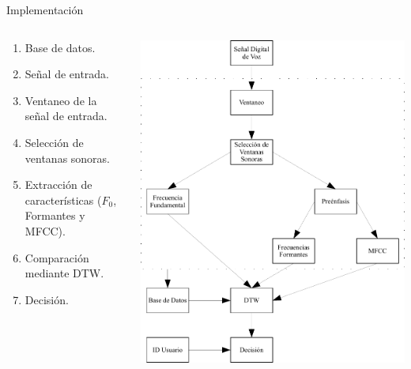 \documentclass{beamer}
\begin{document}
\begin{frame}{Implementación}

\begin{columns}
\begin{column}{0.5\linewidth}
\begin{enumerate}
\item Base de datos.
\item Señal de entrada.
\item Ventaneo de la señal de entrada.
\item Selección de ventanas sonoras.
\item Extracción de características ($F_{0}$, Formantes y MFCC).
\item Comparación mediante DTW.
\item Decisión.
\end{enumerate}
\end{column}

\begin{column}{0.5\linewidth}
\includegraphics[width=\linewidth]{23}
\end{column}

\end{columns}

\end{frame}
\end{document}
